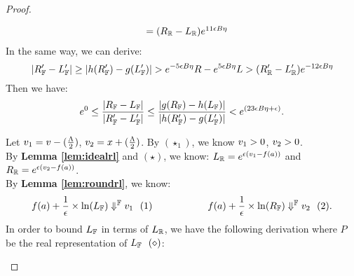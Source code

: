 \documentclass[a4paper,11pt]{article}
\begin{document}
\begin{proof}
\begin{itemize}
\[\begin{array}{ll}
		& = (R_{\mathbb{R}} - L_{\mathbb{R}})e^{11 \epsilon B \eta}
		\end{array}
		\]
		In the same way, we can derive:
		\[
		|R_{\mathbb{F}}' - L_{\mathbb{F}}'|
		\geq 
		|h(R_{\mathbb{F}}' ) - g(L_{\mathbb{F}}' )|
		 > e^{-5 \epsilon B\eta} R - e^{5 \epsilon B\eta} L
		> (R_{\mathbb{R}}' - L_{\mathbb{R}}')e^{- 12 \epsilon B \eta}
		\]
		Then we have:
		\[
		e^0 \leq 
		\frac{|R_{\mathbb{F}} - L_{\mathbb{F}} |}
		{|R_{\mathbb{F}}' - L_{\mathbb{F}}'|}
		\leq
		\frac{|g(R_{\mathbb{F}} ) - h(L_{\mathbb{F}} )|}
		{|h(R_{\mathbb{F}}' ) - g(L_{\mathbb{F}}' )|}
		< e^{(23 \epsilon B \eta + \epsilon)}.		
		\]
%

		Let $v_1 = v - (\frac{\Lambda}{2})$,
		$v_2 = x + (\frac{\Lambda}{2})$.
		By $(\star_1)$, 
		we know $v_1 > 0$, $v_2 > 0$.
		\\
		By \textbf{Lemma \ref{lem:idealrl}} and $(\star) $, we know: $L_{\mathbb{R}} = e^{\epsilon(v_1 - f(a))}$ and 
		$R_{\mathbb{R}} = e^{\epsilon(v_2 - f(a))}$.
		\\
		By \textbf{Lemma \ref{lem:roundrl}}, we know:
		$$f(a) + \frac{1}{\epsilon} \times \ln(L_{\mathbb{F}}) \Downarrow^{\mathbb{F}} v_1 ~~ (1)
		~~~~~~~~~~~~~~~~~
		f(a) + \frac{1}{\epsilon} \times \ln(R_{\mathbb{F}}) \Downarrow^{\mathbb{F}} v_2 ~~ (2).$$
	In order to bound $L_{\mathbb{F}}$ in terms of $L_{\mathbb{R}}$, we have the following derivation where $P$ be the real representation of $L_{\mathbb{F}} ~~ (\diamond)$:



\end{itemize}
\end{proof}
\end{document}

